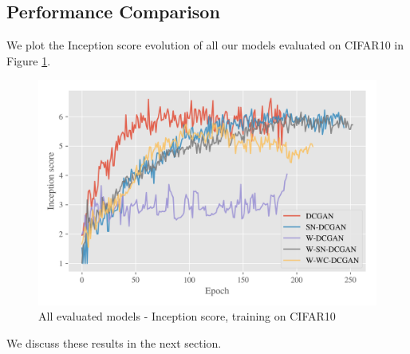 \subsection{Performance Comparison}
We plot the Inception score evolution of all our models evaluated on CIFAR10 in Figure \ref{fig:exp-all-is}.
\begin{figure}[h]
\centering
\includegraphics[width=\textwidth]{../code/results/figures/all_cifar10_is.png}
\caption{All evaluated models - Inception score, training on CIFAR10}
\label{fig:exp-all-is}
\end{figure}

We discuss these results in the next section.

